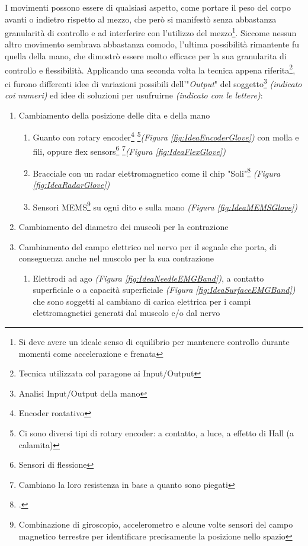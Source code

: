 \documentclass[a4paper, 10pt, final]{article} %
\begin{document}
    I movimenti possono essere di qualsiasi aspetto, come portare il peso del corpo avanti o indietro rispetto al mezzo, che per\`{o} si manifest\`{o} senza abbastanza granularit\`{a} di controllo e ad interferire con l'utilizzo del mezzo\footnote{Si deve avere un ideale senso di equilibrio per mantenere controllo durante momenti come accelerazione e frenata}.
    \clearpage  
    \noindent Siccome nessun altro movimento sembrava abbastanza comodo, l'ultima possibilit\`{a} rimantente fu quella della mano, che dimostr\`{o} essere molto efficace per la sua granularita di controllo e flessibilit\`{a}.
    Applicando una seconda volta la tecnica appena riferita\footnote{Tecnica utilizzata col paragone ai Input/Output},
    ci furono differenti idee di variazioni possibili dell'"\emph{Output}" del soggetto\footnote{Analisi Input/Output della mano} \emph{(indicato coi numeri)} ed idee di soluzioni per usufruirne \emph{(indicato con le lettere)}:
    \begin{enumerate}[label=\emph{(\arabic*)}]
        \item Cambiamento della posizione delle dita e della mano
            \begin{enumerate}[label=\emph{(\alph*)}]
                \item Guanto con rotary encoder\footnote{Encoder roatativo} \footnote{Ci sono diversi tipi di rotary encoder: a contatto, a luce, a effetto di Hall (a calamita)}\emph{(Figura \ref{fig:IdeaEncoderGlove})} con molla e fili, oppure flex sensors\footnote{Sensori di flessione} \footnote{Cambiano la loro resistenza in base a quanto sono piegati}\emph{(Figura \ref{fig:IdeaFlexGlove})}
                \item Bracciale con un radar elettromagnetico come il chip "Soli"\footcite[]{GoogleATAP:Wiki} \emph{(Figura \ref{fig:IdeaRadarGlove})}
                \item Sensori MEMS\footnote{Combinazione di giroscopio, accelerometro e alcune volte sensori del campo magnetico terrestre per identificare precisamente la posizione nello spazio} su ogni dito e sulla mano \emph{(Figura \ref{fig:IdeaMEMSGlove})}
            \end{enumerate}
        \item Cambiamento del diametro dei muscoli per la contrazione
        \item Cambiamento del campo elettrico nel nervo per il segnale che porta, di conseguenza anche nel muscolo per la sua contrazione \label{ItemDeltaChoice}
            \begin{enumerate}[label=\emph{(\alph*)}]
                \item Elettrodi ad ago \emph{(Figura \ref{fig:IdeaNeedleEMGBand})}, a contatto superficiale o a capacit\`{a} superficiale \emph{(Figura \ref{fig:IdeaSurfaceEMGBand})} che sono soggetti al cambiano di carica elettrica per i campi elettromagnetici generati dal muscolo e/o dal nervo \label{ItemEMG}
            \end{enumerate}
    \end{enumerate}
\end{document}
